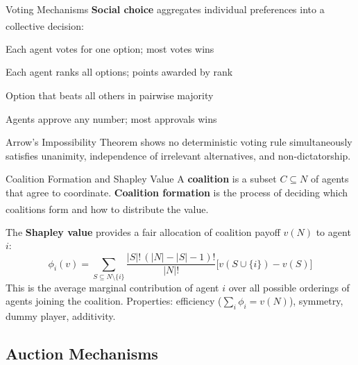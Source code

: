\begin{v3topic}{Voting Mechanisms}
    \textbf{Social choice} aggregates individual preferences into a collective
    decision:\textsuperscript{\cite[][Ch.~9]{shohamMultiagentSystemsAlgorithmic2009}}
    \begin{description}[leftmargin=0.6cm, labelindent=0pt]
        \item[\textbf{Plurality}] Each agent votes for one option; most votes wins
        \item[\textbf{Borda count}] Each agent ranks all options; points awarded by rank
        \item[\textbf{Condorcet}] Option that beats all others in pairwise majority
        \item[\textbf{Approval voting}] Agents approve any number; most approvals wins
    \end{description}
    Arrow's Impossibility Theorem shows no deterministic voting rule simultaneously
    satisfies unanimity, independence of irrelevant alternatives, and non-dictatorship.

\end{v3topic}
\begin{v3topic}{Coalition Formation and Shapley Value}
    A \textbf{coalition} is a subset $C \subseteq N$ of agents that agree to
    coordinate. \textbf{Coalition formation} is the process of deciding which
    coalitions form and how to distribute the
    value.\textsuperscript{\cite[][Ch.~12]{shohamMultiagentSystemsAlgorithmic2009}}

    The \textbf{Shapley value} provides a fair allocation of coalition payoff
    $v(N)$ to agent $i$:
    \begin{equation}
        \phi_i(v) = \sum_{S \subseteq N \setminus \{i\}}
        \frac{|S|!\,(|N|-|S|-1)!}{|N|!}
        \bigl[v(S \cup \{i\}) - v(S)\bigr]
    \end{equation}
    This is the average marginal contribution of agent $i$ over all possible
    orderings of agents joining the coalition.
    Properties: efficiency ($\sum_i \phi_i = v(N)$), symmetry, dummy player, additivity.

\end{v3topic}

\subsection{Auction Mechanisms}

